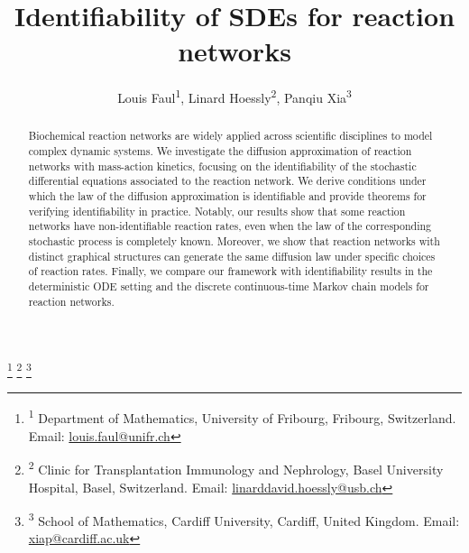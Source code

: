 \documentclass[10pt,a4paper]{amsart}
\theoremstyle{definition}
\theoremstyle{remark}
\theoremstyle{consequence}
\numberwithin{equation}{section}
\begin{document}
\title[Identifiability of SDEs for RNs]{\vspace*{-1.4cm}Identifiability of SDEs for reaction networks}

\author{
Louis Faul\textsuperscript{1}, 
Linard Hoessly\textsuperscript{2}, 
Panqiu Xia\textsuperscript{3}
}

\thanks{\textsuperscript{1} Department of Mathematics, University of Fribourg, Fribourg, Switzerland. Email: \href{mailto:louis.faul@unifr.ch}{louis.faul@unifr.ch}}
\thanks{\textsuperscript{2} Clinic for Transplantation Immunology and Nephrology, Basel University Hospital, Basel, Switzerland. Email: \href{mailto:linarddavid.hoessly@usb.ch}{linarddavid.hoessly@usb.ch}}
\thanks{\textsuperscript{3} School of Mathematics, Cardiff University, Cardiff, United Kingdom. Email: \href{mailto:xiap@cardiff.ac.uk}{xiap@cardiff.ac.uk}}

\date{}
\begin{abstract}
Biochemical reaction networks are widely applied across scientific disciplines to model complex dynamic systems. We investigate the diffusion approximation of reaction networks with mass-action kinetics, focusing on the identifiability of the
stochastic differential equations associated to the reaction network.
  We derive conditions under which the law of the diffusion approximation is identifiable and provide theorems for verifying identifiability in practice. Notably, our results show that some reaction networks have non-identifiable reaction rates, even when the law of the corresponding stochastic process is completely known. Moreover, we show that reaction networks with distinct graphical structures can generate the same diffusion law under specific choices of reaction rates. Finally, we compare our framework with identifiability results in the deterministic ODE setting and the discrete continuous-time Markov chain models for reaction networks.
 \end{abstract}



\clearpage\maketitle
\thispagestyle{empty}
\vspace*{-0.6cm}
\end{document}
